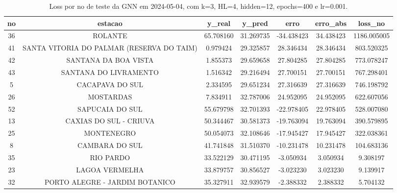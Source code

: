 \begin{table}[h]
\centering
\caption{Loss por no de teste da GNN em 2024-05-04, com k=3, HL=4, hidden=12, epochs=400 e lr=0.001.}
\label{tab:gnn_loss_k3_hl4_h12_e400_d20240504}
\begin{tabular}{ccccccc}
\toprule
no & estacao & y\_real & y\_pred & erro & erro\_abs & loss\_no \\
\midrule
36 & ROLANTE & 65.708160 & 31.269735 & -34.438423 & 34.438423 & 1186.005005 \\
41 & SANTA VITORIA DO PALMAR (RESERVA DO TAIM) & 0.979424 & 29.325857 & 28.346434 & 28.346434 & 803.520325 \\
42 & SANTANA DA BOA VISTA & 1.855373 & 29.659658 & 27.804285 & 27.804285 & 773.078247 \\
43 & SANTANA DO LIVRAMENTO & 1.516342 & 29.216494 & 27.700151 & 27.700151 & 767.298401 \\
5 & CACAPAVA DO SUL & 2.334595 & 29.651234 & 27.316639 & 27.316639 & 746.198792 \\
26 & MOSTARDAS & 7.834911 & 32.787006 & 24.952095 & 24.952095 & 622.607056 \\
52 & SAPUCAIA DO SUL & 55.679798 & 32.701393 & -22.978405 & 22.978405 & 528.007080 \\
13 & CAXIAS DO SUL - CRIUVA & 50.344467 & 30.581373 & -19.763094 & 19.763094 & 390.579895 \\
25 & MONTENEGRO & 50.054073 & 32.108646 & -17.945427 & 17.945427 & 322.038361 \\
8 & CAMBARA DO SUL & 41.741848 & 31.510370 & -10.231478 & 10.231478 & 104.683136 \\
35 & RIO PARDO & 33.522129 & 30.471195 & -3.050934 & 3.050934 & 9.308197 \\
23 & LAGOA VERMELHA & 33.879757 & 30.856527 & -3.023230 & 3.023230 & 9.139917 \\
32 & PORTO ALEGRE - JARDIM BOTANICO & 35.327911 & 32.939579 & -2.388332 & 2.388332 & 5.704132 \\
\bottomrule
\end{tabular}
\end{table}
